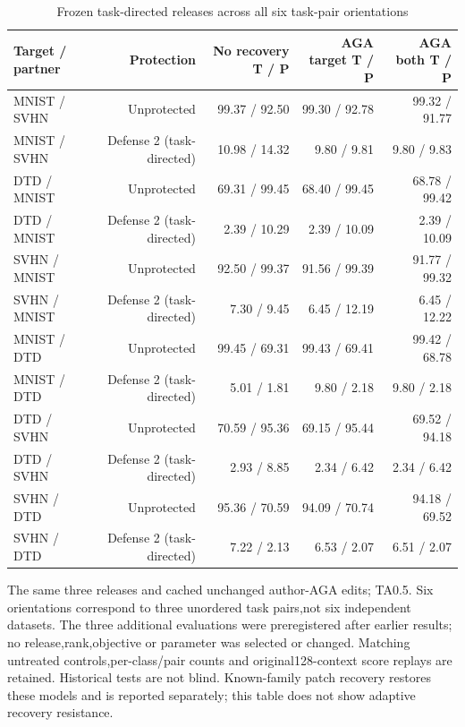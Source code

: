 \begin{table}[!htbp]
\centering
\small
\caption{Frozen task-directed releases across all six task-pair orientations}
\label{tab:cross_pairs}
\begin{tabular}{lrrrr}
\toprule
Target / partner & Protection & No recovery T / P & AGA target T / P & AGA both T / P \\
\midrule
MNIST / SVHN & Unprotected & 99.37 / 92.50 & 99.30 / 92.78 & 99.32 / 91.77 \\
MNIST / SVHN & Defense 2 (task-directed) & 10.98 / 14.32 & 9.80 / 9.81 & 9.80 / 9.83 \\
DTD / MNIST & Unprotected & 69.31 / 99.45 & 68.40 / 99.45 & 68.78 / 99.42 \\
DTD / MNIST & Defense 2 (task-directed) & 2.39 / 10.29 & 2.39 / 10.09 & 2.39 / 10.09 \\
SVHN / MNIST & Unprotected & 92.50 / 99.37 & 91.56 / 99.39 & 91.77 / 99.32 \\
SVHN / MNIST & Defense 2 (task-directed) & 7.30 / 9.45 & 6.45 / 12.19 & 6.45 / 12.22 \\
MNIST / DTD & Unprotected & 99.45 / 69.31 & 99.43 / 69.41 & 99.42 / 68.78 \\
MNIST / DTD & Defense 2 (task-directed) & 5.01 / 1.81 & 9.80 / 2.18 & 9.80 / 2.18 \\
DTD / SVHN & Unprotected & 70.59 / 95.36 & 69.15 / 95.44 & 69.52 / 94.18 \\
DTD / SVHN & Defense 2 (task-directed) & 2.93 / 8.85 & 2.34 / 6.42 & 2.34 / 6.42 \\
SVHN / DTD & Unprotected & 95.36 / 70.59 & 94.09 / 70.74 & 94.18 / 69.52 \\
SVHN / DTD & Defense 2 (task-directed) & 7.22 / 2.13 & 6.53 / 2.07 & 6.51 / 2.07 \\
\bottomrule
\end{tabular}
\par\vspace{3pt}\begin{minipage}{0.98\linewidth}\footnotesize The same three releases and cached unchanged author-AGA edits; TA0.5. Six orientations correspond to three unordered task pairs,not six independent datasets. The three additional evaluations were preregistered after earlier results; no release,rank,objective or parameter was selected or changed. Matching untreated controls,per-class/pair counts and original128-context score replays are retained. Historical tests are not blind. Known-family patch recovery restores these models and is reported separately; this table does not show adaptive recovery resistance.\end{minipage}
\end{table}

